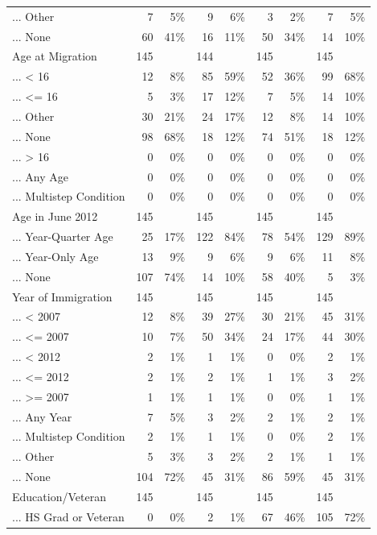 \documentclass[
  letterpaper,
  DIV=11,
  numbers=noendperiod]{scrartcl}
\begin{document}
\begin{table}[!htbp]
{\begin{tabular}{lrrrrrrrr}
... Other & 7 & 5\% & 9 & 6\% & 3 & 2\% & 7 & 5\% \\ 
... None & 60 & 41\% & 16 & 11\% & 50 & 34\% & 14 & 10\% \\ 
Age at Migration & 145 &  & 144 &  & 145 &  & 145 &  \\ 
... < 16 & 12 & 8\% & 85 & 59\% & 52 & 36\% & 99 & 68\% \\ 
... <= 16 & 5 & 3\% & 17 & 12\% & 7 & 5\% & 14 & 10\% \\ 
... Other & 30 & 21\% & 24 & 17\% & 12 & 8\% & 14 & 10\% \\ 
... None & 98 & 68\% & 18 & 12\% & 74 & 51\% & 18 & 12\% \\ 
... > 16 & 0 & 0\% & 0 & 0\% & 0 & 0\% & 0 & 0\% \\ 
... Any Age & 0 & 0\% & 0 & 0\% & 0 & 0\% & 0 & 0\% \\ 
... Multistep Condition & 0 & 0\% & 0 & 0\% & 0 & 0\% & 0 & 0\% \\ 
Age in June 2012 & 145 &  & 145 &  & 145 &  & 145 &  \\ 
... Year-Quarter Age & 25 & 17\% & 122 & 84\% & 78 & 54\% & 129 & 89\% \\ 
... Year-Only Age & 13 & 9\% & 9 & 6\% & 9 & 6\% & 11 & 8\% \\ 
... None & 107 & 74\% & 14 & 10\% & 58 & 40\% & 5 & 3\% \\ 
Year of Immigration & 145 &  & 145 &  & 145 &  & 145 &  \\ 
... < 2007 & 12 & 8\% & 39 & 27\% & 30 & 21\% & 45 & 31\% \\ 
... <= 2007 & 10 & 7\% & 50 & 34\% & 24 & 17\% & 44 & 30\% \\ 
... < 2012 & 2 & 1\% & 1 & 1\% & 0 & 0\% & 2 & 1\% \\ 
... <= 2012 & 2 & 1\% & 2 & 1\% & 1 & 1\% & 3 & 2\% \\ 
... >= 2007 & 1 & 1\% & 1 & 1\% & 0 & 0\% & 1 & 1\% \\ 
... Any Year & 7 & 5\% & 3 & 2\% & 2 & 1\% & 2 & 1\% \\ 
... Multistep Condition & 2 & 1\% & 1 & 1\% & 0 & 0\% & 2 & 1\% \\ 
... Other & 5 & 3\% & 3 & 2\% & 2 & 1\% & 1 & 1\% \\ 
... None & 104 & 72\% & 45 & 31\% & 86 & 59\% & 45 & 31\% \\ 
Education/Veteran & 145 &  & 145 &  & 145 &  & 145 &  \\ 
... HS Grad or Veteran & 0 & 0\% & 2 & 1\% & 67 & 46\% & 105 & 72\% \\ 

\end{tabular}}
\end{table}
\end{document}
